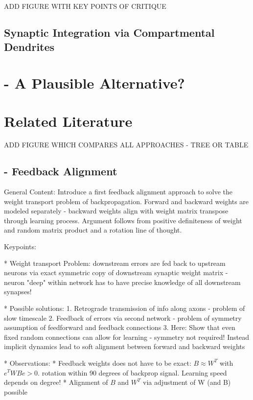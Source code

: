 \documentclass{article}
\theoremstyle{definition}
\begin{document}
ADD FIGURE WITH KEY POINTS OF CRITIQUE

\subsection*{Synaptic Integration via Compartmental Dendrites}

\newpage
\section*{\citet{guerguiev2017} - A Plausible Alternative?}

\newpage
\section{Related Literature}

ADD FIGURE WHICH COMPARES ALL APPROACHES - TREE OR TABLE

\subsection*{\citet{lillicrap2016} - Feedback Alignment}

General Content: Introduce a first feedback alignment approach to solve the weight transport problem of backpropagation. Forward and backward weights are modeled separately - backward weights align with weight matrix transpose through learning process. Argument follows from positive definiteness of weight and random matrix product and a rotation line of thought.


Keypoints:

* Weight transport Problem: downstream errors are fed back to upstream neurons via exact symmetric copy of downstream synaptic weight matrix - neuron "deep" within network has to have precise knowledge of all downstream synapses!

* Possible solutions:
    1. Retrograde transmission of info along axons - problem of slow timescale
    2. Feedback of errors via second network - problem of symmetry assumption of feedforward and feedback connections
    3. Here: Show that even fixed random connections can allow for learning - symmetry not required! Instead implicit dynamics lead to soft alignment between forward and backward weights

* Observations:
    * Feedback weights does not have to be exact: $B \approx W^T$ with $e^TWBe > 0$. rotation within 90 degrees of backprop signal. Learning speed depends on degree!
    * Alignment of $B$ and $W^T$ via adjustment of W (and B) possible
\end{document}
